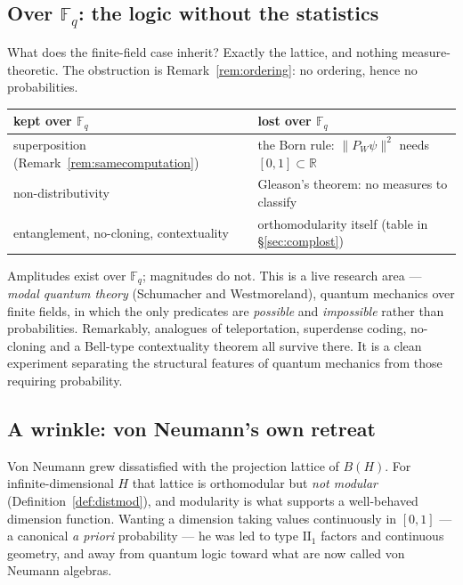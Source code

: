 \documentclass[11pt,a4paper]{article}
\theoremstyle{definition}
\theoremstyle{remark}
\newcommand{\FF}{\mathbb{F}}
\newcommand{\RR}{\mathbb{R}}
\begin{document}
\subsection{Over $\FF_q$: the logic without the statistics}

What does the finite-field case inherit? Exactly the lattice, and nothing measure-theoretic.
The obstruction is Remark~\ref{rem:ordering}: no ordering, hence no probabilities.

\begin{center}
\begin{tabular}{ll}
\toprule
kept over $\FF_q$ & lost over $\FF_q$ \\
\midrule
superposition (Remark~\ref{rem:samecomputation}) & the Born rule: $\lVert P_W\psi\rVert^{2}$
  needs $[0,1] \subset \RR$ \\
non-distributivity & Gleason's theorem: no measures to classify \\
entanglement, no-cloning, contextuality & orthomodularity itself (table in
  \S\ref{sec:complost}) \\
\bottomrule
\end{tabular}
\end{center}

Amplitudes exist over $\FF_q$; magnitudes do not. This is a live research area ---
\emph{modal quantum theory} (Schumacher and Westmoreland), quantum mechanics over finite
fields, in which the only predicates are \emph{possible} and \emph{impossible} rather than
probabilities. Remarkably, analogues of teleportation, superdense coding, no-cloning and a
Bell-type contextuality theorem all survive there. It is a clean experiment separating the
structural features of quantum mechanics from those requiring probability.

\subsection{A wrinkle: von Neumann's own retreat}

Von Neumann grew dissatisfied with the projection lattice of $B(H)$. For infinite-dimensional
$H$ that lattice is orthomodular but \emph{not modular} (Definition~\ref{def:distmod}), and
modularity is what supports a well-behaved dimension function. Wanting a dimension taking
values continuously in $[0,1]$ --- a canonical \emph{a priori} probability --- he was led to
type $\mathrm{II}_1$ factors and continuous geometry, and away from quantum logic toward what
are now called von Neumann algebras.
\end{document}

